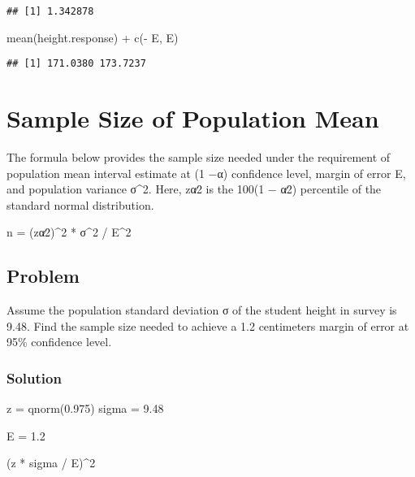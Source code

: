 \documentclass[
]{article}
\newenvironment{Shaded}{\begin{snugshade}}{\end{snugshade}}
\newcommand{\DecValTok}[1]{\textcolor[rgb]{0.00,0.00,0.81}{#1}}
\newcommand{\FloatTok}[1]{\textcolor[rgb]{0.00,0.00,0.81}{#1}}
\newcommand{\FunctionTok}[1]{\textcolor[rgb]{0.00,0.00,0.00}{#1}}
\newcommand{\NormalTok}[1]{#1}
\newcommand{\OtherTok}[1]{\textcolor[rgb]{0.56,0.35,0.01}{#1}}
\newcommand{\SpecialCharTok}[1]{\textcolor[rgb]{0.00,0.00,0.00}{#1}}
\begin{document}
\begin{verbatim}
## [1] 1.342878
\end{verbatim}

\begin{Shaded}
\begin{Highlighting}[]
\FunctionTok{mean}\NormalTok{(height.response) }\SpecialCharTok{+} \FunctionTok{c}\NormalTok{(}\SpecialCharTok{{-}}\NormalTok{ E, E)}
\end{Highlighting}
\end{Shaded}

\begin{verbatim}
## [1] 171.0380 173.7237
\end{verbatim}

\hypertarget{sample-size-of-population-mean}{%
\section{Sample Size of Population
Mean}\label{sample-size-of-population-mean}}

The formula below provides the sample size needed under the requirement
of population mean interval estimate at (1 −α) confidence level, margin
of error E, and population variance σ\^{}2. Here, zα∕2 is the 100(1 −
α∕2) percentile of the standard normal distribution.

n = (zα∕2)\^{}2 * σ\^{}2 / E\^{}2

\hypertarget{problem-7}{%
\subsection{Problem}\label{problem-7}}

Assume the population standard deviation σ of the student height in
survey is 9.48. Find the sample size needed to achieve a 1.2 centimeters
margin of error at 95\% confidence level.

\hypertarget{solution-9}{%
\subsubsection{Solution}\label{solution-9}}

\begin{Shaded}
\begin{Highlighting}[]
\NormalTok{z }\OtherTok{=} \FunctionTok{qnorm}\NormalTok{(}\FloatTok{0.975}\NormalTok{)}
\NormalTok{sigma }\OtherTok{=} \FloatTok{9.48}

\NormalTok{E }\OtherTok{=} \FloatTok{1.2}

\NormalTok{(z }\SpecialCharTok{*}\NormalTok{ sigma }\SpecialCharTok{/}\NormalTok{ E)}\SpecialCharTok{\^{}}\DecValTok{2}
\end{Highlighting}
\end{Shaded}
\end{document}
